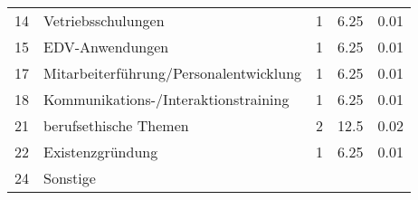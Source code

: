 \begin{longtable}{lXrrr}
     14 &
     \multicolumn{1}{X}{ Vetriebsschulungen   } &


       \num{1} &
       \num[round-mode=places,round-precision=2]{6,25} &
         \num[round-mode=places,round-precision=2]{0,01} \\

     15 &
     \multicolumn{1}{X}{ EDV-Anwendungen   } &


       \num{1} &
       \num[round-mode=places,round-precision=2]{6,25} &
         \num[round-mode=places,round-precision=2]{0,01} \\

     17 &
     \multicolumn{1}{X}{ Mitarbeiterführung/Personalentwicklung   } &


       \num{1} &
       \num[round-mode=places,round-precision=2]{6,25} &
         \num[round-mode=places,round-precision=2]{0,01} \\

     18 &
     \multicolumn{1}{X}{ Kommunikations-/Interaktionstraining   } &


       \num{1} &
       \num[round-mode=places,round-precision=2]{6,25} &
         \num[round-mode=places,round-precision=2]{0,01} \\

     21 &
     \multicolumn{1}{X}{ berufsethische Themen   } &


       \num{2} &
       \num[round-mode=places,round-precision=2]{12,5} &
         \num[round-mode=places,round-precision=2]{0,02} \\

     22 &
     \multicolumn{1}{X}{ Existenzgründung   } &


       \num{1} &
       \num[round-mode=places,round-precision=2]{6,25} &
         \num[round-mode=places,round-precision=2]{0,01} \\

     24 &
     \multicolumn{1}{X}{ Sonstige   } &



\end{longtable}
